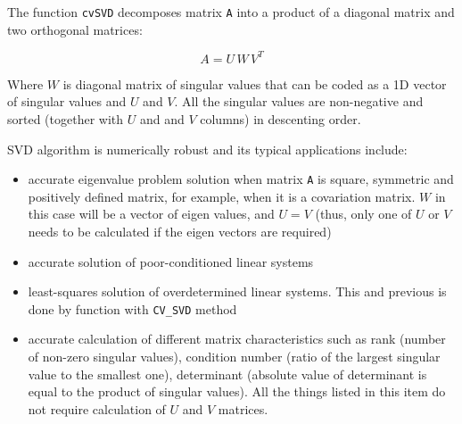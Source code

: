 The function \texttt{cvSVD} decomposes matrix \texttt{A} into a product of a diagonal matrix and two orthogonal matrices:

\[
A=U \, W \, V^T
\]

Where $W$ is diagonal matrix of singular values that can be coded as a
1D vector of singular values and $U$ and $V$. All the singular values
are non-negative and sorted (together with $U$ and and $V$ columns)
in descenting order.

SVD algorithm is numerically robust and its typical applications include:

\begin{itemize}
  \item accurate eigenvalue problem solution when matrix \texttt{A}
  is square, symmetric and positively defined matrix, for example, when
  it is a covariation matrix. $W$ in this case will be a vector
  of eigen values, and $U = V$
  (thus, only one of $U$ or $V$ needs to be calculated if
  the eigen vectors are required)
  \item accurate solution of poor-conditioned linear systems
  \item least-squares solution of overdetermined linear systems. This and previous is done by  function with \texttt{CV\_SVD} method
  \item accurate calculation of different matrix characteristics such as rank (number of non-zero singular values), condition number (ratio of the largest singular value to the smallest one), determinant (absolute value of determinant is equal to the product of singular values). All the things listed in this item do not require calculation of $U$ and $V$ matrices.
\end{itemize}


